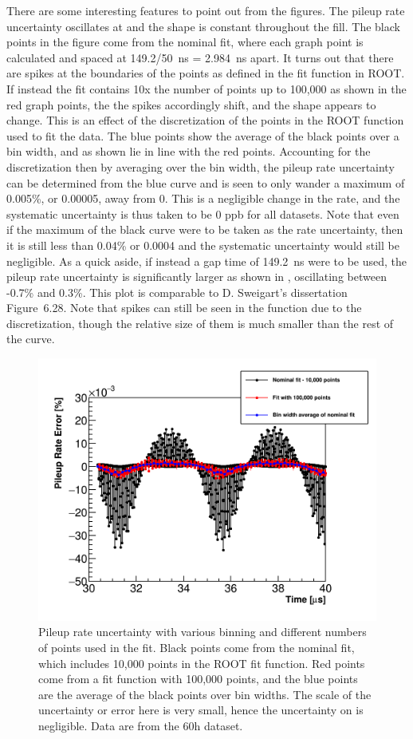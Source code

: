 There are some interesting features to point out from the figures. The pileup rate uncertainty oscillates at \wa and the shape is constant throughout the fill. The black points in the figure come from the nominal fit, where each graph point is calculated and spaced at 149.2/50~ns = 2.984~ns apart. It turns out that there are spikes at the boundaries of the points as defined in the fit function in ROOT. If instead the fit contains 10x the number of points up to 100,000 as shown in the red graph points, the the spikes accordingly shift, and the shape appears to change. This is an effect of the discretization of the points in the ROOT function used to fit the data. The blue points show the average of the black points over a bin width, and as shown lie in line with the red points. Accounting for the discretization then by averaging over the bin width, the pileup rate uncertainty can be determined from the blue curve and is seen to only wander a maximum of 0.005\%, or 0.00005, away from 0. This is a negligible change in the rate, and the systematic uncertainty is thus taken to be 0 ppb for all datasets. Note that even if the maximum of the black curve were to be taken as the rate uncertainty, then it is still less than 0.04\% or 0.0004 and the systematic uncertainty would still be negligible. As a quick aside, if instead a gap time of \SI{149.2}{\ns} were to be used, the pileup rate uncertainty is significantly larger as shown in , oscillating between -0.7\% and 0.3\%. This plot is comparable to D. Sweigart's dissertation Figure~6.28. Note that spikes can still be seen in the function due to the discretization, though the relative size of them is much smaller than the rest of the curve.




\begin{figure}
    \centering
    \includegraphics[width=.6\textwidth]{PileupRateError}
    \caption[]{Pileup rate uncertainty with various binning and different numbers of points used in the fit. Black points come from the nominal fit, which includes 10,000 points in the ROOT fit function. Red points come from a fit function with 100,000 points, and the blue points are the average of the black points over bin widths. The scale of the uncertainty or error here is very small, hence the uncertainty on \R is negligible. Data are from the 60h dataset.}
    \label{fig:pileupRateError}
\end{figure}

